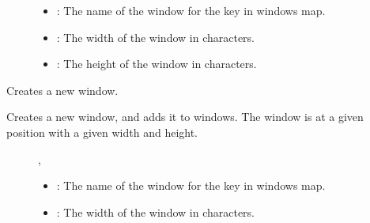 \documentclass[letterpaper,10pt,english]{sphinxmanual}
\begin{document}
\begin{fulllineitems}
\begin{fulllineitems}
\begin{description}
\item[{}] \leavevmode\begin{itemize}
\item {} 
: The name of the window for the key in windows map. 

\item {} 
: The width of the window in characters. 

\item {} 
: The height of the window in characters. 

\end{itemize}

\end{description}


\end{fulllineitems}


\begin{fulllineitems}
\label{\detokenize{index:_CPPv2N7ostendo10InitWindowENSt6stringEiiii}}%
\pysigstartmultiline
{}\label{\detokenize{index:Pessumnamespaceostendo_1a471c4077531c8fd99d79c1faf7a0d09e}}%
\pysigstopmultiline
Creates a new window. 

Creates a new window, and adds it to windows. The window is at a given position with a given width and height. \begin{description}
\item[{}] \leavevmode
{\hyperref[\detokenize{index:Pessumnamespaceostendo_1ab45e3689aa0cb8a2e3a175c0aed97880}]{}}, {\hyperref[\detokenize{index:Pessumnamespaceostendo_1a4c5850c8a109e159e874ecce8a5dc62a}]{}} 

\item[{}] \leavevmode\begin{itemize}
\item {} 
: The name of the window for the key in windows map. 

\item {} 
: The width of the window in characters. 


\end{itemize}
\end{description}
\end{fulllineitems}
\end{fulllineitems}
\end{document}
